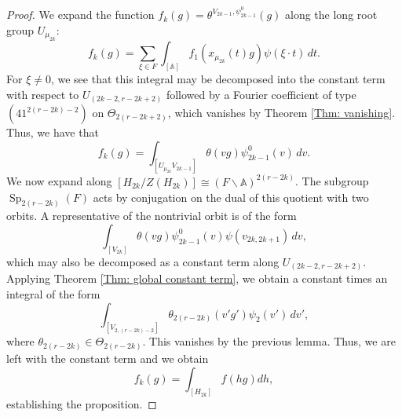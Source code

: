 \documentclass[11pt,reqno]{amsart}
\theoremstyle{definition}
\theoremstyle{remark}
\theoremstyle{definition}
\begin{document}
\begin{proof}
We expand the function $f_k(g)=\theta^{V_{2k-1},\psi^0_{2k-1}}(g) $ along the long root group $U_{\mu_{2k}}$:
\[
f_k(g) = \sum_{\xi\in F}\int_{[{\mathbb A}]}f_1(x_{\mu_{2k}}(t)g)\psi(\xi\cdot t)\,dt.
\]
For $\xi\neq 0$, we see that this integral may be decomposed into the constant term with respect to $U_{(2k-2,r-2k+2)}$ followed by a Fourier coefficient of type $(41^{2(r-2k)-2})$ on $\Theta_{2(r-2k+2)}$, which vanishes by Theorem \ref{Thm: vanishing}. Thus, we have that
\[
f_k(g) = \int_{[U_{\mu_{2k}}V_{2k-1}]}\theta(vg)\psi^0_{2k-1}(v)\,dv.
\]
We now expand along $[H_{2k}/Z(H_{2k})]\cong (F\backslash{\mathbb A})^{2(r-2k)}$. The subgroup $\operatorname{Sp}_{2(r-2k)}(F)$ acts by conjugation on the dual of this quotient with two orbits. A representative of the nontrivial orbit is of the form
\[
\int_{[V_{2k}]}\theta(vg)\psi^0_{2k-1}(v)\psi(v_{2k,2k+1})\,dv, 
\]
which may also be decomposed as a constant term along $U_{(2k-2,r-2k+2)}$. Applying Theorem \ref{Thm: global constant term}, we obtain a constant times an integral of the form  
\[
\displaystyle\int_{[V_{2,(r-2k)-2}]}\theta_{2(r-2k)}(v'g')\psi_2(v')\,dv',
\]
 where $\theta_{2(r-2k)}\in \Theta_{2(r-2k)}$. This vanishes by the previous lemma.
Thus, we are left with the constant term and we obtain
\[
f_k(g) = \int_{[H_{2k}]}f(hg)dh,
\]
establishing the proposition.
\end{proof}


\end{document}
